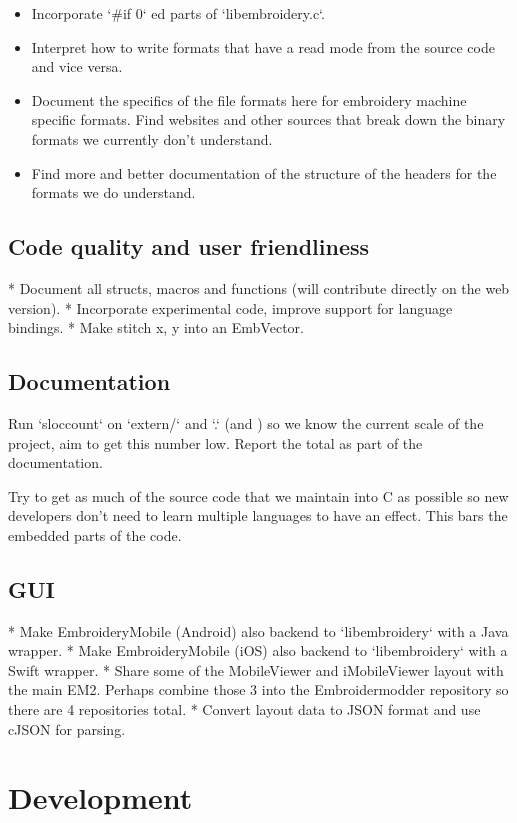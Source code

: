 \documentclass[10pt]{report}
\begin{document}
\begin{itemize}
\item Incorporate `\#if 0` ed parts of `libembroidery.c`.
\item Interpret how to write formats that have a read mode from the source
code and vice versa.
\item Document the specifics of the file formats here for embroidery machine
specific formats. Find websites and other sources that break down the binary
formats we currently don't understand.
\item Find more and better documentation of the structure of the headers for the
formats we do understand.
\end{itemize}

\subsection{Code quality and user friendliness}

* Document all structs, macros and functions (will contribute directly
  on the web version).
* Incorporate experimental code, improve support for language bindings.
* Make stitch x, y into an EmbVector.

\subsection{Documentation}

Run `sloccount` on `extern/` and `.` (and ) so we know the
current scale of the project, aim to get this number low. Report the total as
part of the documentation.

Try to get as much of the source code that we maintain into C as possible so
new developers don't need to learn multiple languages to have an effect. This
bars the embedded parts of the code.

\subsection{GUI}

* Make EmbroideryMobile (Android) also backend to `libembroidery` with a Java wrapper.
* Make EmbroideryMobile (iOS) also backend to `libembroidery` with a Swift wrapper.
* Share some of the MobileViewer and iMobileViewer layout with the main EM2. Perhaps combine those 3 into the Embroidermodder repository so there are 4 repositories total.
* Convert layout data to JSON format and use cJSON for parsing.

\section{Development}
\end{document}
